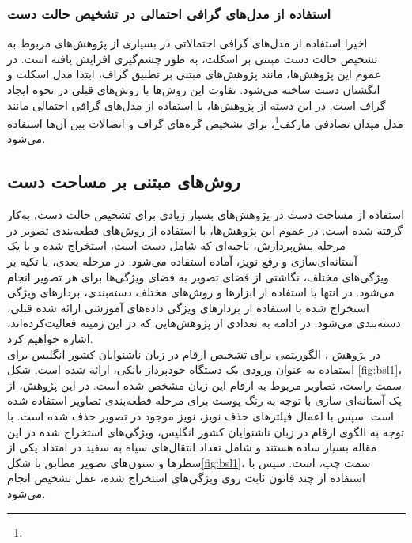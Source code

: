 \documentclass[11.5pt,a4paper]{article}
\newcommand{\enfootnote}[1]{\footnote{\lr{#1}}}
\begin{document}
 \subsubsection{ استفاده از مدل‌های گرافی احتمالی در تشخیص حالت دست}
اخیرا استفاده از مدل‌های گرافی احتمالاتی در بسیاری از پژوهش‌های مربوط به تشخیص حالت دست مبتنی بر اسکلت، به طور چشم‌گیری افزایش یافته است. در عموم این پژوهش‌ها، مانند پژوهش‌های مبتنی بر تطبیق گراف، ابتدا مدل اسکلت و انگشتان دست ساخته می‌شود. تفاوت این روش‌ها با روش‌های قبلی در نحوه ایجاد گراف است. در این دسته از پژوهش‌ها، با استفاده از مدل‌های گرافی احتمالی مانند مدل‌ میدان تصادفی مارکف\enfootnote{Markov Random Field (MRF)}، برای تشخیص گره‌های گراف  و اتصالات بین آن‌ها استفاده می‌شود.


\subsection{روش‌های مبتنی بر مساحت دست} 
استفاده از مساحت دست در پژوهش‌های بسیار زیادی برای تشخیص حالت دست، به‌کار گرفته شده است. در عموم این پژوهش‌‌ها، با استفاده از روش‌های قطعه‌بندی تصویر در مرحله پیش‌پردازش، ناحیه‌ای که شامل دست است، استخراج شده و با یک آستانه‌ای‌سازی و رفع نویز، آماده استفاده می‌شود. در مرحله بعدی، با تکیه بر ویژگی‌های مختلف، نگاشتی از فضای تصویر به فضای ویژگی‌ها برای هر تصویر انجام می‌شود. در انتها با استفاده از ابزارها و روش‌های مختلف دسته‌بندی، بردارهای ویژگی استخراج شده با استفاده از بردارهای ویژگی داده‌های آموزشی ارائه شده قبلی، دسته‌بندی می‌شود. در ادامه به تعدادی از پژوهش‌هایی که در این زمینه فعالیت‌کرده‌اند، اشاره خواهیم کرد.
\\
در پژوهش \cite{rupanagudi2015high}، الگوریتمی برای تشخیص ارقام در زبان ناشنوایان کشور انگلیس برای استفاده به عنوان ورودی یک دستگاه خودپرداز بانکی، ارائه شده است. شکل \ref{fig:bsl1}، سمت راست، تصاویر مربوط به ارقام این زبان مشخص شده است. در این پژوهش، از یک آستانه‌ای سازی با توجه به رنگ پوست برای مرحله قطعه‌بندی تصاویر استفاده شده است. سپس با اعمال فیلترهای حذف نویز، نویز موجود در تصویر حذف شده است. با توجه به الگوی ارقام در زبان ناشنوایان کشور انگلیس، ویژگی‌های استخراج شده در این مقاله بسیار ساده هستند و شامل تعداد انتقال‌های سیاه به سفید در امتداد یکی از سطرها و ستون‌های تصویر مطابق با شکل\ref{fig:bsl1}، سمت چپ، است. سپس با استفاده از چند قانون ثابت روی ویژگی‌های استخراج شده، عمل تشخیص انجام می‌شود.
\end{document}
